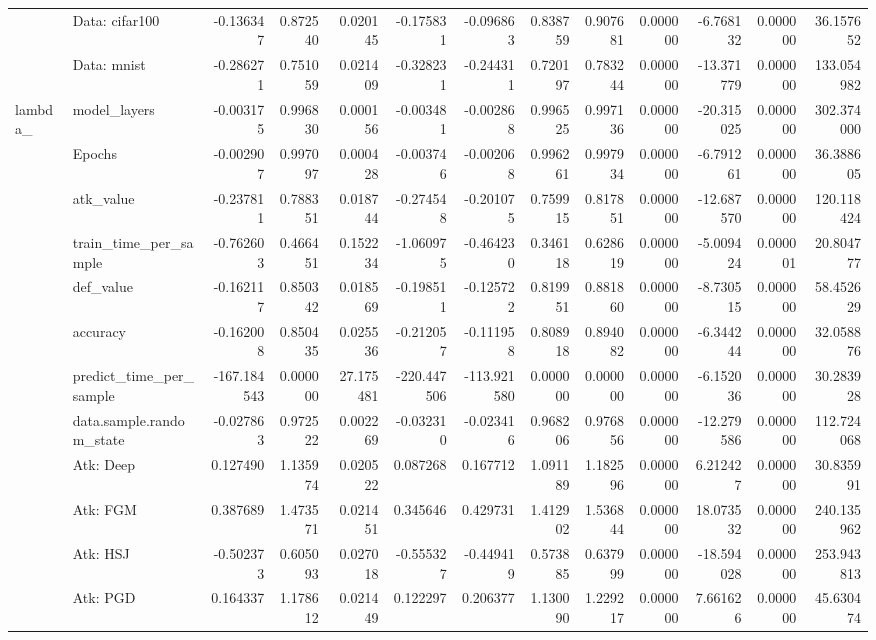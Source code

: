 \begin{table}[htbp]
\begin{tabular}{llrrrrrrrrrrr}
 & Data: cifar100 & -0.136347 & 0.872540 & 0.020145 & -0.175831 & -0.096863 & 0.838759 & 0.907681 & 0.000000 & -6.768132 & 0.000000 & 36.157652 \\
 & Data: mnist & -0.286271 & 0.751059 & 0.021409 & -0.328231 & -0.244311 & 0.720197 & 0.783244 & 0.000000 & -13.371779 & 0.000000 & 133.054982 \\
\cline{1-13}
\multirow[t]{22}{*}{lambda\_} & model\_layers & -0.003175 & 0.996830 & 0.000156 & -0.003481 & -0.002868 & 0.996525 & 0.997136 & 0.000000 & -20.315025 & 0.000000 & 302.374000 \\
 & Epochs & -0.002907 & 0.997097 & 0.000428 & -0.003746 & -0.002068 & 0.996261 & 0.997934 & 0.000000 & -6.791261 & 0.000000 & 36.388605 \\
 & atk\_value & -0.237811 & 0.788351 & 0.018744 & -0.274548 & -0.201075 & 0.759915 & 0.817851 & 0.000000 & -12.687570 & 0.000000 & 120.118424 \\
 & train\_time\_per\_sample & -0.762603 & 0.466451 & 0.152234 & -1.060975 & -0.464230 & 0.346118 & 0.628619 & 0.000000 & -5.009424 & 0.000001 & 20.804777 \\
 & def\_value & -0.162117 & 0.850342 & 0.018569 & -0.198511 & -0.125722 & 0.819951 & 0.881860 & 0.000000 & -8.730515 & 0.000000 & 58.452629 \\
 & accuracy & -0.162008 & 0.850435 & 0.025536 & -0.212057 & -0.111958 & 0.808918 & 0.894082 & 0.000000 & -6.344244 & 0.000000 & 32.058876 \\
 & predict\_time\_per\_sample & -167.184543 & 0.000000 & 27.175481 & -220.447506 & -113.921580 & 0.000000 & 0.000000 & 0.000000 & -6.152036 & 0.000000 & 30.283928 \\
 & data.sample.random\_state & -0.027863 & 0.972522 & 0.002269 & -0.032310 & -0.023416 & 0.968206 & 0.976856 & 0.000000 & -12.279586 & 0.000000 & 112.724068 \\
 & Atk: Deep & 0.127490 & 1.135974 & 0.020522 & 0.087268 & 0.167712 & 1.091189 & 1.182596 & 0.000000 & 6.212427 & 0.000000 & 30.835991 \\
 & Atk: FGM & 0.387689 & 1.473571 & 0.021451 & 0.345646 & 0.429731 & 1.412902 & 1.536844 & 0.000000 & 18.073532 & 0.000000 & 240.135962 \\
 & Atk: HSJ & -0.502373 & 0.605093 & 0.027018 & -0.555327 & -0.449419 & 0.573885 & 0.637999 & 0.000000 & -18.594028 & 0.000000 & 253.943813 \\
 & Atk: PGD & 0.164337 & 1.178612 & 0.021449 & 0.122297 & 0.206377 & 1.130090 & 1.229217 & 0.000000 & 7.661626 & 0.000000 & 45.630474 \\

\end{tabular}
\end{table}
